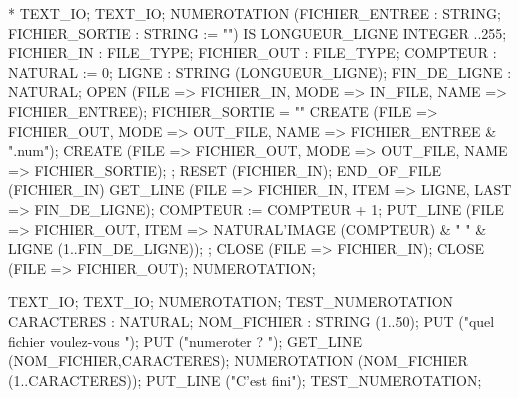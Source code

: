 \begin{programs}*
    \WITH TEXT\_IO;  \USE TEXT\_IO;
    \PROCEDURE NUMEROTATION
              (FICHIER\_ENTREE : \IN STRING;
               FICHIER\_SORTIE : \IN STRING := "") IS
      \SUBTYPE LONGUEUR\_LIGNE \IS INTEGER
                             ..255;
      FICHIER\_IN  : FILE\_TYPE;
      FICHIER\_OUT : FILE\_TYPE;
      COMPTEUR : NATURAL := 0;
      LIGNE : STRING (LONGUEUR\_LIGNE);
      FIN\_DE\_LIGNE : NATURAL;
    \BEGIN
      OPEN (FILE => FICHIER\_IN,
            MODE => IN\_FILE,
            NAME => FICHIER\_ENTREE);
      \IF FICHIER\_SORTIE = "" \THEN
        CREATE (FILE => FICHIER\_OUT,
                MODE => OUT\_FILE,
                NAME => FICHIER\_ENTREE \& ".num");
      \ELSE
        CREATE (FILE => FICHIER\_OUT,
                MODE => OUT\_FILE,
                NAME => FICHIER\_SORTIE);
      \END \IF;
      RESET (FICHIER\_IN);
      \WHILE \NOT END\_OF\_FILE (FICHIER\_IN) \LOOP
        GET\_LINE (FILE => FICHIER\_IN,
                  ITEM => LIGNE,
                  LAST => FIN\_DE\_LIGNE);
        COMPTEUR := COMPTEUR + 1;
        PUT\_LINE (FILE => FICHIER\_OUT,
                  ITEM => NATURAL'IMAGE (COMPTEUR) \&
                          " " \& LIGNE (1..FIN\_DE\_LIGNE));
      \END \LOOP;
      CLOSE (FILE => FICHIER\_IN);
      CLOSE (FILE => FICHIER\_OUT);
    \END NUMEROTATION;

    \WITH TEXT\_IO;  \USE TEXT\_IO;
    \WITH NUMEROTATION;
    \PROCEDURE TEST\_NUMEROTATION \IS
      CARACTERES  : NATURAL;
      NOM\_FICHIER : STRING (1..50);
    \BEGIN
      PUT ("quel fichier voulez-vous ");
      PUT ("numeroter ? ");
      GET\_LINE (NOM\_FICHIER,CARACTERES);
      NUMEROTATION (NOM\_FICHIER (1..CARACTERES));
      PUT\_LINE ("C'est fini");
    \END TEST\_NUMEROTATION;
\end{programs}

